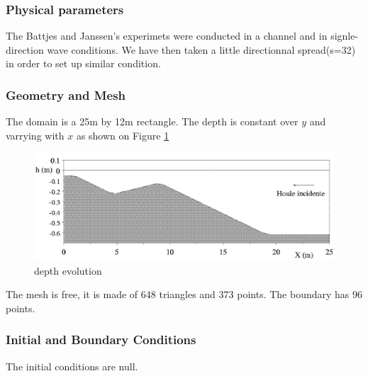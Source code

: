 %
%
%

%
%
\subsubsection{Physical parameters}
%
The Battjes and Janssen's experimets were conducted in a channel and in signle-direction wave conditions. We have then taken a little directionnal spread(s=32) in order to set up similar condition.

%
%
\subsubsection{Geometry and Mesh}
%
The domain is a 25m by 12m rectangle. The depth is constant over $y$ and varrying with $x$ as shown on Figure \ref{bathybj}

\begin{figure} [!h]
\centering
\includegraphics[scale = 0.8]{bathy.png}
 \caption{depth evolution}
\label{bathybj}
\end{figure}

The mesh is free, it is made of 648 triangles and 373 points. The boundary has 96 points.
%
%
\subsubsection{Initial and Boundary Conditions}
The initial conditions are null.

